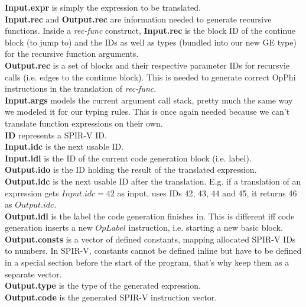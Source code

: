 \documentclass[letterpaper,12pt]{article}
\begin{document}
\noindent \textbf{Input.expr} is simply the expression to be translated. \\
\textbf{Input.rec} and \textbf{Output.rec} are information needed to generate recursive
functions. Inside a \textit{rec-func} construct, \textbf{Input.rec} is the block 
ID of the continue block (to jump to) and the IDs as well as types (bundled into
our new GE type) for the recursive function arguments. \\
\textbf{Output.rec} is a set of blocks and their respective parameter IDs for
recursvie calls (i.e. edges to the continue block). This is needed to
generate correct OpPhi instructions in the translation of \textit{rec-func}. \\
\textbf{Input.args} models the current argument call stack, pretty much the same
way we modeled it for our typing rules. This is once again needed because
we can't translate function expressions on their own. \\
\textbf{ID} represents a SPIR-V ID. \\
\textbf{Input.idc} is the next usable ID. \\
\textbf{Input.idl} is the ID of the current code generation block (i.e. label). \\
\textbf{Output.ido} is the ID holding the result of the translated expression. \\
\textbf{Output.idc} is the next usable ID after the translation.
E.g. if a translation of an expression gets $Input.idc = 42$ as input, 
uses IDs 42, 43, 44 and 45, it returns 46 as $Output.idc$. \\
\textbf{Output.idl} is the label the code generation finishes in.
This is different iff code generation inserts a new $OpLabel$ instruction,
i.e. starting a new basic block. \\
\textbf{Output.consts} is a vector of defined constants, mapping
allocated SPIR-V IDs to numbers. In SPIR-V, constants
cannot be defined inline but have to be defined in a special section before
the start of the program, that's why keep them as a separate vector. \\
\textbf{Output.type} is the type of the generated expression. \\
\textbf{Output.code} is the generated SPIR-V instruction vector.
\end{document}
